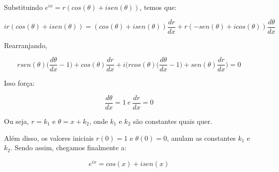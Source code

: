 \documentclass[a4paper]{article}
\begin{document}
Substituindo \(e^{ix} = r(cos(\theta) + isen(\theta))\), temos que:

\begin{equation}
ir(cos(\theta) + isen(\theta)) = (cos(\theta) + isen(\theta)) \frac{dr}{dx} + r(-sen(\theta) + icos(\theta))\frac{d\theta}{dx}
\end{equation}

Rearranjando,

\begin{equation}
r sen(\theta) \bigg(\frac{d\theta}{dx} - 1\bigg) + cos(\theta) \frac{dr}{dx} + i \bigg(r cos(\theta) \bigg(\frac{d\theta}{dx} - 1 \bigg) + sen(\theta) \frac{dr}{dx} \bigg) = 0
\end{equation}

Isso força:

\begin{equation}
\frac{d \theta}{dx} = 1 \ e \ \frac{dr}{dx} = 0
\end{equation}

Ou seja, \(r = k_1\) e \(\theta = x + k_2\), onde \(k_1\) e \(k_2\) são constantes quais quer.

Além disso, os valores iniciais \(r(0) = 1\) e \(\theta(0) = 0\), anulam as constantes \(k_1\) e \(k_2\). Sendo assim, chegamos finalmente a:

\begin{equation}
e^{ix} = cos(x) + isen(x)
\end{equation}
\end{document}
